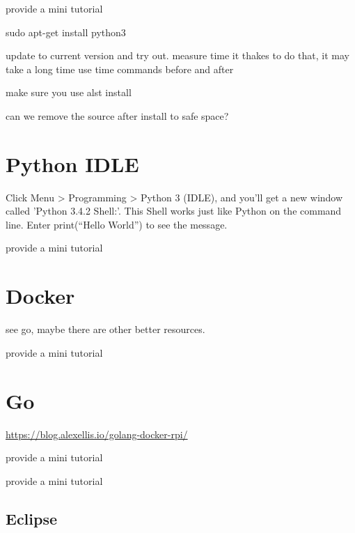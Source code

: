 \begin{exercise}
provide a mini tutorial 
\end{exercise}

sudo apt-get install python3

update to current version and try out. measure time it thakes to do that, it may take a long time use time commands before and after

make sure you use alst install


can we remove the source after install to safe space?

\section{Python IDLE}

Click Menu > Programming > Python 3 (IDLE), and you'll get a new
window called 'Python 3.4.2 Shell:'. This Shell works just like Python
on the command line. Enter print(``Hello World'') to see the message.

\begin{exercise}
provide a mini tutorial 
\end{exercise}


\section{Docker}

see go, maybe there are other better resources.

\begin{exercise}
provide a mini tutorial 
\end{exercise}

\section{Go}

\url{https://blog.alexellis.io/golang-docker-rpi/}

\begin{exercise}
provide a mini tutorial 
\end{exercise}


\begin{exercise}
provide a mini tutorial 
\end{exercise}

\subsection{Eclipse}

